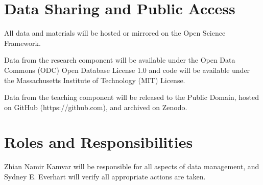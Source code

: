 \documentclass[12pt,letterpaper]{article}
\begin{document}
\section{Data Sharing and Public Access}

All data and materials will be hosted or mirrored on the Open Science Framework.

Data from the research component will be available under the Open Data Commons (ODC) Open Database License 1.0 and code will be available under the Massachusetts Institute of Technology (MIT) License. 

Data from the teaching component will be released to the Public Domain, hosted on GitHub (https://github.com), and archived on Zenodo.



\section{Roles and Responsibilities}

Zhian Namir Kamvar will be responsible for all aspects of data management, and Sydney E. Everhart will verify all appropriate actions are taken. 



\end{document}
